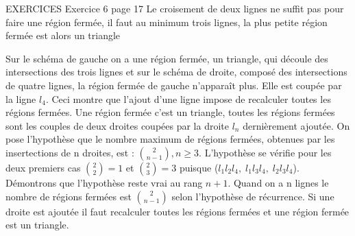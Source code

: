 \documentclass[9pt]{amsart}
\begin{document}
EXERCICES\newline\newline
Exercice 6 page 17\newline
Le croisement de deux lignes ne suffit pas pour faire une r\'{e}gion ferm\'{e}e, il faut au minimum trois lignes, la plus petite r\'{e}gion ferm\'{e}e est alors un triangle \newline
{}\newline
Sur le sch\'{e}ma de gauche on a une r\'{e}gion ferm\'{e}e, un triangle, qui d\'{e}coule des intersections des trois lignes et sur le sch\'{e}ma de droite, compos\'{e} des intersections de quatre lignes, la r\'{e}gion ferm\'{e}e de gauche n'apparaît plus. Elle est coup\'{e}e par la ligne $l_4$. Ceci montre que l'ajout d'une ligne impose de recalculer toutes les r\'{e}gions ferm\'{e}es. \newline
Une r\'{e}gion ferm\'{e}e c'est un triangle, toutes les r\'{e}gions ferm\'{e}es sont les couples de deux droites coup\'{e}es par la droite $l_n$ derni\`{e}rement ajout\'{e}e. \newline\newline
On pose l'hypoth\`{e}se que le nombre maximum de r\'{e}gions ferm\'{e}es, obtenues  par les insertections de n droites, est :  $\binom{2}{n-1},  n\geq3$. \newline\newline
L'hypoth\`{e}se se v\'{e}rifie pour les deux premiers cas $\binom{2}{2} = 1$ et $\binom{2}{3} = 3$ puisque ($l_1l_2l_4,\; l_1l_3l_4,\; l_2l_3l_4$). D\'{e}montrons que l'hypoth\`{e}se reste vrai au rang $n+1$.
Quand on a n lignes le nombre de r\'{e}gions ferm\'{e}es est $\binom{2}{n-1}$ selon l'hypoth\`{e}se de r\'{e}currence. Si une droite est ajout\'{e}e il faut recalculer toutes les r\'{e}gions ferm\'{e}es et une r\'{e}gion ferm\'{e}e est un triangle. 
\end{document}
